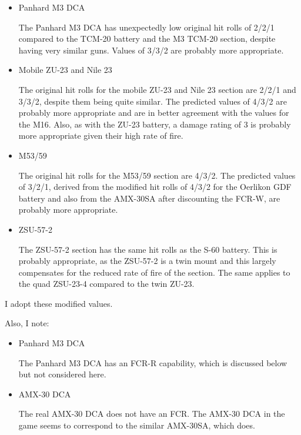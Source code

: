 \documentclass[10pt]{article}
\begin{document}
{\begin{itemize}
        \item Panhard M3 DCA

            The Panhard M3 DCA has unexpectedly low original hit rolls of 2/2/1 compared to the TCM-20 battery and the M3 TCM-20 section, despite having very similar guns. Values of 3/3/2 are probably more appropriate.

        \item Mobile ZU-23 and Nile 23

            The original hit rolls for the mobile ZU-23 and Nile 23 section are 2/2/1 and 3/3/2, despite them being quite similar. The predicted values of 4/3/2 are probably more appropriate and are in better agreement with the values for the M16. Also, as with the ZU-23 battery, a damage rating of 3 is probably more appropriate given their high rate of fire.

        \item M53/59

            The original hit rolls for the M53/59 section are 4/3/2. The predicted values of 3/2/1, derived from the modified hit rolls of 4/3/2 for the Oerlikon GDF battery and also from the AMX-30SA after discounting the FCR-W, are probably more appropriate.

        \item ZSU-57-2

            The ZSU-57-2 section has the same hit rolls as the S-60 battery. This is probably appropriate, as the ZSU-57-2 is a twin mount and this largely compensates for the reduced rate of fire of the section. The same applies to the quad ZSU-23-4 compared to the twin ZU-23.
    \end{itemize}

    I adopt these modified values.

    Also, I note:

    \begin{itemize}

        \item Panhard M3 DCA

            The Panhard M3 DCA has an FCR-R capability, which is discussed below but not considered here.

        \item AMX-30 DCA

            The real AMX-30 DCA does not have an FCR. The AMX-30 DCA in the game seems to correspond to the similar AMX-30SA, which does.

    \end{itemize}

}
\end{document}
